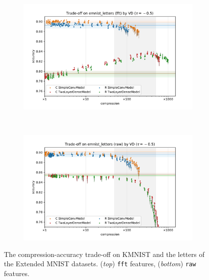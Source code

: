 \documentclass[a4paper,10pt]{article}
\begin{document}
\begin{figure}[!t]
\begin{subfigure}[b]{1.\textwidth}
    \centering
    \includegraphics[width=0.8\columnwidth]{figure__mnist-like__trade-off/legacy__VD__emnist_letters__fft__-0.5.pdf}
  \end{subfigure} \\%
  \begin{subfigure}[b]{1.\textwidth}  %
    \centering
    \includegraphics[width=0.8\columnwidth]{figure__mnist-like__trade-off/legacy__VD__emnist_letters__raw__-0.5.pdf}
  \end{subfigure}
  \caption{%
    The compression-accuracy trade-off on KMNIST and the letters of the Extended MNIST datasets.
    (\textit{top}) \texttt{fft} features, (\textit{bottom}) \texttt{raw} features.
  }
  \label{fig:mnist-like__trade-off}
\end{figure}

\end{document}
